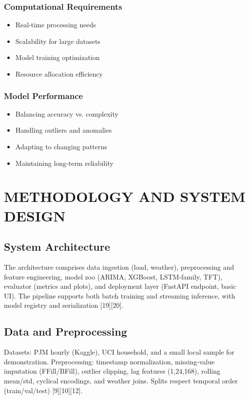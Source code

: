 \documentclass[12pt,a4paper]{report}
\begin{document}
\subsection{Computational Requirements}
\begin{itemize}
\item Real-time processing needs
\item Scalability for large datasets
\item Model training optimization
\item Resource allocation efficiency
\end{itemize}

\subsection{Model Performance}
\begin{itemize}
\item Balancing accuracy vs. complexity
\item Handling outliers and anomalies
\item Adapting to changing patterns
\item Maintaining long-term reliability
\end{itemize}


\chapter{METHODOLOGY AND SYSTEM DESIGN}
\section{System Architecture}
The architecture comprises data ingestion (load, weather), preprocessing and feature engineering, model zoo (ARIMA, XGBoost, LSTM-family, TFT), evaluator (metrics and plots), and deployment layer (FastAPI endpoint, basic UI). The pipeline supports both batch training and streaming inference, with model registry and serialization [19][20].

\section{Data and Preprocessing}
Datasets: PJM hourly (Kaggle), UCI household, and a small local sample for demonstration. Preprocessing: timestamp normalization, missing-value imputation (FFill/BFill), outlier clipping, lag features (1,24,168), rolling mean/std, cyclical encodings, and weather joins. Splits respect temporal order (train/val/test) [9][10][12].
\end{document}
